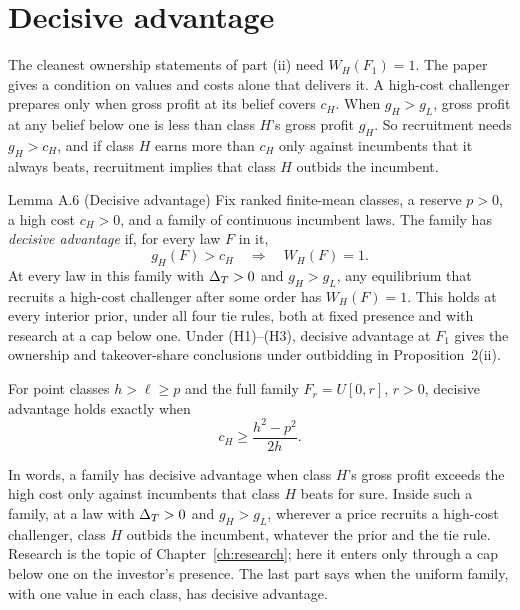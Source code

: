 \section{Decisive advantage}\label{sec:ccc-decisive}

The cleanest ownership statements of part (ii) need \(W_H(F_1)=1\). The paper gives a condition on values and costs
alone that delivers it. A high-cost challenger prepares only when gross profit at its belief covers \(c_H\). When
\(g_H>g_L\), gross profit at any belief below one is less than class \(H\)'s gross profit \(g_H\). So recruitment
needs \(g_H>c_H\), and if class \(H\) earns more than \(c_H\) only against incumbents that it always beats,
recruitment implies that class \(H\) outbids the incumbent.

\begin{paperresult}{Lemma A.6 (Decisive advantage)}
Fix ranked finite-mean classes, a reserve \(p>0\), a high cost \(c_H>0\), and a family of continuous incumbent laws.
The family has \emph{decisive advantage} if, for every law \(F\) in it,
\[
g_H(F)>c_H\quad\Longrightarrow\quad W_H(F)=1.
\]
At every law in this family with \(\Delta_T>0\) and \(g_H>g_L\), any equilibrium that recruits a high-cost challenger after
some order has \(W_H(F)=1\). This holds at every interior prior, under all four tie rules, both at fixed presence and
with research at a cap below one. Under (H1)--(H3), decisive advantage at \(F_1\) gives the ownership and
takeover-share conclusions under outbidding in Proposition~2(ii).

For point classes \(h>\ell\ge p\) and the full family \(F_r=U[0,r]\), \(r>0\), decisive advantage holds exactly when
\[
c_H\ge\frac{h^2-p^2}{2h}.
\]
\end{paperresult}

In words, a family has decisive advantage when class \(H\)'s gross profit exceeds the high cost only against
incumbents that class \(H\) beats for sure. Inside such a family, at a law with \(\Delta_T>0\) and \(g_H>g_L\), wherever a
price recruits a high-cost challenger, class \(H\) outbids the incumbent, whatever the prior and the tie rule. Research is the topic of
Chapter~\ref{ch:research}; here it enters only through a cap below one on the investor's presence. The last part
says when the uniform family, with one value in each class, has decisive advantage.

